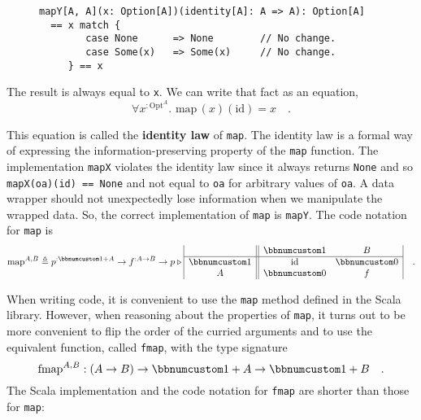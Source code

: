 \begin{wrapfigure}{l}{0.58\columnwidth}%
\vspace{-0.6\baselineskip}
\begin{lstlisting}
mapY[A, A](x: Option[A])(identity[A]: A => A): Option[A]
  == x match {
        case None      => None        // No change.
        case Some(x)   => Some(x)     // No change.
     } == x
\end{lstlisting}
\vspace{0.1\baselineskip}
\end{wrapfigure}%

\noindent The result is always equal to \lstinline!x!. We can write
that fact as an equation,\vspace{-0.3\baselineskip}
\[
\forall x^{:\text{Opt}^{A}}.\,\,\text{map}\,(x)(\text{id})=x\quad.
\]
\vspace{-0.85\baselineskip}

\noindent This equation is called the \textbf{identity law}
of \lstinline!map!. The identity law is a formal way of expressing
the information-preserving property of the \lstinline!map! function.
The implementation \lstinline!mapX! violates the identity law since
it always returns \lstinline!None! and so \lstinline!mapX(oa)(id) == None!
and not equal to \lstinline!oa! for arbitrary values of \lstinline!oa!.
A data wrapper should not unexpectedly lose information when we manipulate
the wrapped data. So, the correct implementation of \lstinline!map!
is \lstinline!mapY!. The code notation for \lstinline!map! is\vspace{-0.4\baselineskip}
\[
\text{map}^{A,B}\triangleq p^{:\bbnum 1+A}\rightarrow f^{:A\rightarrow B}\rightarrow p\triangleright\begin{array}{|c||cc|}
 & \bbnum 1 & B\\
\hline \bbnum 1 & \text{id} & \bbnum 0\\
A & \bbnum 0 & f
\end{array}\quad.
\]

When writing code, it is convenient to use the \lstinline!map! method
defined in the Scala library. However, when reasoning about the properties
of \lstinline!map!, it turns out to be more convenient to flip the
order of the curried arguments and to use the equivalent function,
called \lstinline!fmap!, with the type signature
\[
\text{fmap}^{A,B}:\left(A\rightarrow B\right)\rightarrow\bbnum 1+A\rightarrow\bbnum 1+B\quad.
\]
The Scala implementation and the code notation for \lstinline!fmap!
are shorter than those for \lstinline!map!:

